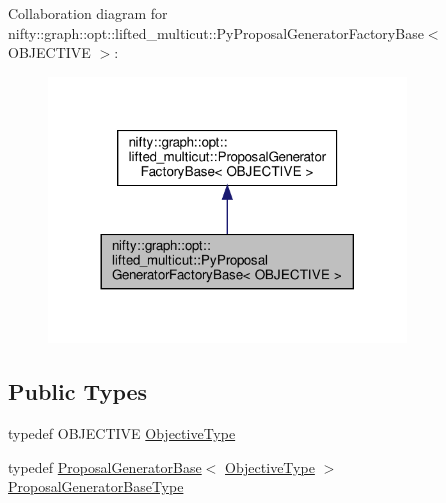 Collaboration diagram for nifty\+:\+:graph\+:\+:opt\+:\+:lifted\+\_\+multicut\+:\+:Py\+Proposal\+Generator\+Factory\+Base$<$ O\+B\+J\+E\+C\+T\+I\+VE $>$\+:
\nopagebreak
\begin{figure}[H]
\begin{center}
\leavevmode
\includegraphics[width=269pt]{classnifty_1_1graph_1_1opt_1_1lifted__multicut_1_1PyProposalGeneratorFactoryBase__coll__graph}
\end{center}
\end{figure}
\subsection*{Public Types}
\begin{DoxyCompactItemize}
\item 
typedef O\+B\+J\+E\+C\+T\+I\+VE \hyperlink{classnifty_1_1graph_1_1opt_1_1lifted__multicut_1_1PyProposalGeneratorFactoryBase_ae6a34208c3b9e4821ab10103a4e35202}{Objective\+Type}
\item 
typedef \hyperlink{classnifty_1_1graph_1_1opt_1_1lifted__multicut_1_1ProposalGeneratorBase}{Proposal\+Generator\+Base}$<$ \hyperlink{classnifty_1_1graph_1_1opt_1_1lifted__multicut_1_1ProposalGeneratorFactoryBase_a1986f0a3868e76ba5613f49ca4fc7dc6}{Objective\+Type} $>$ \hyperlink{classnifty_1_1graph_1_1opt_1_1lifted__multicut_1_1PyProposalGeneratorFactoryBase_a1f936c8afa6b524afc2ccfb783558673}{Proposal\+Generator\+Base\+Type}
\end{DoxyCompactItemize}
